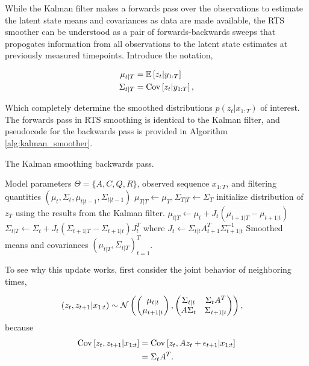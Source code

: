 \documentclass[14pt]{extreport}
\begin{document}
While the Kalman filter makes a forwards pass over the observations to estimate
the latent state means and covariances as data are made available, the RTS
smoother can be understood as a pair of forwards-backwards sweeps that
propogates information from all observations to the latent state estimates at
previously measured timepoints. Introduce the notation,

\begin{align*}
\mu_{t \vert T} &= \mathbb{E}\left[{z_{t} \vert y_{1:T}}\right] \\
\Sigma_{t \vert T} &= \mathrm{Cov}\left[{z_{t} \vert y_{1:T}}\right],
\end{align*}

Which completely determine the smoothed distributions $p\left(z_{t} \vert
x_{1:T}\right)$ of interest. The forwards pass in RTS smoothing is identical to
the Kalman filter, and pseudocode for the backwards pass is provided in
Algorithm \ref{alg:kalman_smoother}.

\begin{algorithm}
   \caption{The Kalman smoothing backwards pass.}
   \label{alg:kalman_smoother}
\begin{algorithmic}
   Model parameters $\Theta = \{A, C, Q, R\}$,
    observed sequence $x_{1:T}$, and filtering quantities $\left(\mu_{t},
    \Sigma_{t}, \mu_{t \vert t - 1}, \Sigma_{t \vert t - 1}\right)$
    \STATE $\mu_{T \vert T} \leftarrow \mu_{T}, \Sigma_{T \vert T} \leftarrow
    \Sigma_{T}$ \hfill initialize distribution of $z_{T}$ using the results from
    the Kalman filter.
    \STATE $\mu_{t \vert T} \leftarrow \mu_{t} + J_{t}\left(\mu_{t + 1 \vert T} - \mu_{t + 1 \vert t}\right)$
    \STATE $\Sigma_{t \vert T} \leftarrow \Sigma_{t} + J_{t}\left(\Sigma_{t + 1 \vert T} - \Sigma_{t + 1 \vert t}\right)J_{t}^{T}$
    \STATE where $J_{t} \leftarrow \Sigma_{t \vert t}A_{t + 1}^{T} \Sigma_{t + 1\vert t}^{-1}$
    \ENDFOR
     Smoothed means and covariances $\left(\mu_{t \vert T},
    \Sigma_{t \vert T}\right)_{t = 1}^{T}$.
\end{algorithmic}
\end{algorithm}

To see why this update works, first consider the joint behavior of neighboring
times,

\begin{align*}
   \left(z_{t}, z_{t + 1} \vert x_{1:t}\right) &\sim \mathcal{N}\left(
\begin{pmatrix}
  \mu_{t \vert t} \\
  \mu_{t + 1 \vert t}
\end{pmatrix},
\begin{pmatrix}
  \Sigma_{t \vert t} & \Sigma_{t} A^{T} \\
  A \Sigma_{t} & \Sigma_{t + 1 \vert t}
\end{pmatrix}\right),
\end{align*}
because
\begin{align*}
\mathrm{Cov}\left[{z_{t}, z_{t + 1} \vert x_{1:t}}\right] &= \mathrm{Cov}\left[{z_{t}, Az_{t} + \epsilon_{t + 1} \vert x_{1:t}}\right] \\
&= \Sigma_{t}A^{T}.
\end{align*}
\end{document}
